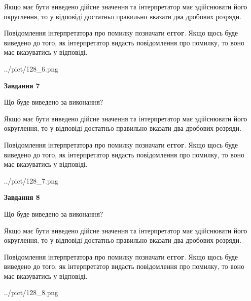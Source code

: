 \documentclass[12pt, ukrainian]{article}
\begin{document}
{\begin {Large}
Якщо має бути виведено дійсне значення та інтерпретатор має здійснювати його округлення, 
то у відповіді достатньо правильно вказати два дробових розряди.

Повідомлення інтерпретатора про помилку позначати \textbf{error}.
Якщо щось буде виведено до того, як інтерпретатор видасть повідомлення про помилку, 
то воно має вказуватись у відповіді. \par

\begin{center}
	{../pict/128_6.png}
\end{center}
\newpage

{\begin {center}\textbf{Завдання 7}\end {center}}\par
Що буде виведено за виконання? \par

Якщо має бути виведено дійсне значення та інтерпретатор має здійснювати його округлення, 
то у відповіді достатньо правильно вказати два дробових розряди.

Повідомлення інтерпретатора про помилку позначати \textbf{error}.
Якщо щось буде виведено до того, як інтерпретатор видасть повідомлення про помилку, 
то воно має вказуватись у відповіді. \par

\begin{center}
	{../pict/128_7.png}
\end{center}
\newpage

{\begin {center}\textbf{Завдання 8}\end {center}}\par
Що буде виведено за виконання? \par

Якщо має бути виведено дійсне значення та інтерпретатор має здійснювати його округлення, 
то у відповіді достатньо правильно вказати два дробових розряди.

Повідомлення інтерпретатора про помилку позначати \textbf{error}.
Якщо щось буде виведено до того, як інтерпретатор видасть повідомлення про помилку, 
то воно має вказуватись у відповіді. \par

\begin{center}
	{../pict/128_8.png}
\end{center}
\newpage


\end{Large}}
\end{document}
